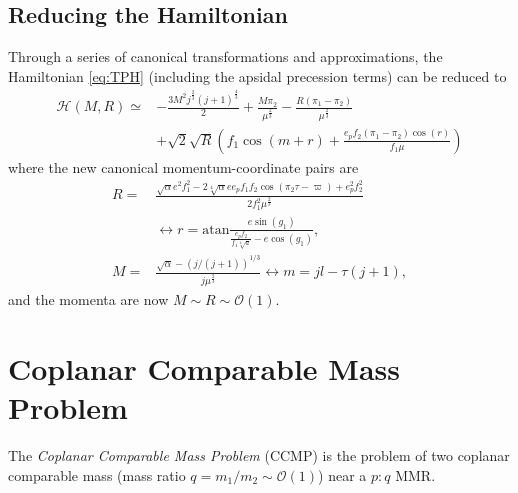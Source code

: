 \documentclass[usenatbib,twocolumn]{mnras}
\begin{document}
\subsection{Reducing the Hamiltonian}
Through a series of canonical transformations and approximations, the Hamiltonian \ref{eq:TPH} (including the apsidal precession terms) can be reduced to 
\begin{align}
    \mathcal H(M,R) \simeq& - \frac{3 M^{2} j^{\frac{2}{3}} \left(j + 1\right)^{\frac{4}{3}}}{2} + \frac{M \pi_{2}}{\mu^{\frac{2}{3}}} 
    - \frac{R \left( \pi_{1} - \pi_{2}\right)}{\mu^{\frac{2}{3}}}
    \nonumber\\
    &+ \sqrt{2} \sqrt{R} \left(f_{1} \cos{\left(m + r \right)}
        +\frac{e_{p} f_{2} \left(\pi_{1} - \pi_{2}\right) \cos{\left(r \right)}}{f_{1} \mu}\right)
\end{align}
where the new canonical momentum-coordinate pairs are
\begin{align}
    R =& \frac{\sqrt{\alpha} e^{2} f_{1}^{2} - 2 \sqrt[4]{\alpha} e e_{p} f_{1} f_{2} \cos{\left(\pi_{2} \tau - \varpi \right)} + e_{p}^{2} f_{2}^{2}}{2 f_{1}^{2} \mu^{\frac{2}{3}}}\\
    &\leftrightarrow r = \mathrm{atan}\frac{e \sin{\left(g_{1} \right)}}{ \frac{e_{p} f_{2}}{f_{1} \sqrt[4]{a}}- e \cos{\left(g_{1} \right)}},\\
    M=&\frac{\sqrt{\alpha}- (j/(j+1))^{1/3} }{j \mu^{\frac{2}{3}}}
    \leftrightarrow m =  j l - \tau \left(j + 1\right),
\end{align}
and the momenta are now $M\sim R \sim\mathcal O(1)$.


\section{Coplanar Comparable Mass Problem}
The \emph{Coplanar Comparable Mass Problem} (CCMP) is the problem of two coplanar comparable mass (mass ratio $q=m_1/m_2\sim\mathcal O(1)$) near a $p:q$ MMR.
\end{document}

